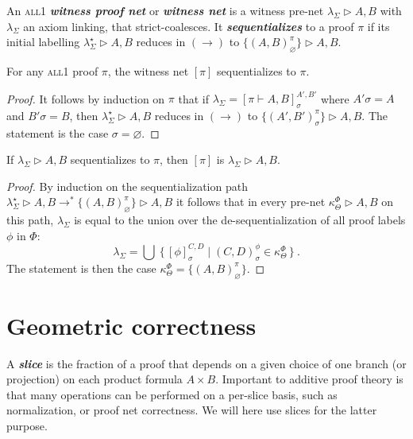 \documentclass[UKenglish]{lipics-v2016}
\theoremstyle{plain}
\newcommand\defn[1]{\textit{\textbf{#1}}}
\newcommand\all{\textsc{all}}
\newcommand\+{+}
\renewcommand\*{\times}
\newcommand\prf[3]{#1\vdash\!#2,#3}
\newcommand\net[3]{#1\triangleright #2,#3}
\newcommand\deseq[4][\sigma]{[#2]_{#1}^{#3,#4}}
\newcommand\link[3][\sigma]{(#2,#3)_{#1}}
\newcommand\scoal{\rightarrow} %
\begin{document}
\begin{definition}
An \all1 \defn{witness proof net} or \defn{witness net} is a witness pre-net $\net{\lambda_\Sigma}AB$ with $\lambda_\Sigma$ an axiom linking, that strict-coalesces. It \defn{sequentializes} to a proof $\pi$ if its initial labelling $\net{\lambda_\Sigma^\star}AB$ reduces in $(\scoal)$ to $\net{\{\link[\varnothing]AB^\pi\}}AB$.
\end{definition}


\begin{theorem}
\label{thm:proof->net->proof}
For any \all1 proof $\pi$, the witness net $[\pi]$ sequentializes to $\pi$. 
\end{theorem}

\begin{proof}
It follows by induction on $\pi$ that if $\lambda_\Sigma=\deseq{\prf\pi AB}{A'}{B'}$ where $A'\sigma=A$ and $B'\sigma=B$, then $\net{\lambda^\star_\Sigma}AB$ reduces in $(\scoal)$ to $\net{\{\link{A'}{B'}^\pi\}}AB$. The statement is the case $\sigma=\varnothing$.
\end{proof}


\begin{theorem}
\label{thm:net->proof->net}
If $\net{\lambda_\Sigma}AB$ sequentializes to $\pi$, then $[\pi]$ is $\net{\lambda_\Sigma}AB$. 
\end{theorem}

\begin{proof}
By induction on the sequentialization path 
$\net{\lambda_\Sigma^\star}AB\scoal^*\net{\{\link[\varnothing]AB^\pi\}}AB$
it follows that in every pre-net $\net{\kappa_\Theta^\Phi}AB$ on this path, $\lambda_\Sigma$ is equal to the union over the de-sequentialization of all proof labels $\phi$ in $\Phi$:
\[
	\lambda_\Sigma=\bigcup~\{\,\deseq\phi CD \mid \link CD^\phi \in \kappa_\Theta^\Phi\,\}~.
\]
The statement is then the case $\kappa_\Theta^\Phi=\{\link[\varnothing]AB^\pi\}$.
\end{proof}


\section{Geometric correctness}

A \defn{slice} is the fraction of a proof that depends on a given choice of one branch (or projection) on each product formula $A\*B$. Important to additive proof theory is that many operations can be performed on a per-slice basis, such as normalization, or proof net correctness. We will here use slices for the latter purpose.
\end{document}
